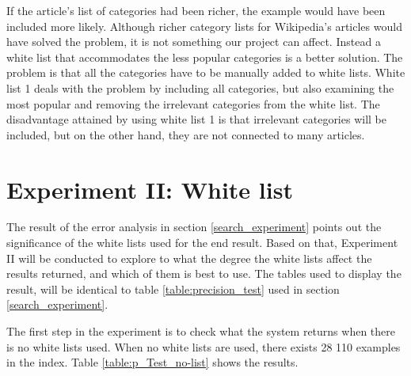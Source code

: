 If the article's list of categories had been richer, the example would have been included more likely. Although richer category lists for Wikipedia's articles would have solved the problem, it is not something our project can affect. Instead a white list that accommodates the less popular categories is a better solution. The problem is that all the categories have to be manually added to white lists. White list 1 deals with the problem by including all categories, but also examining the most popular and removing the irrelevant categories from the white list. The disadvantage attained by using white list 1 is that irrelevant categories will be included, but on the other hand, they are not connected to many articles. 

\section{Experiment II: White list}

The result of the error analysis in section \ref{search_experiment} points out the significance of the white lists used for the end result. Based on that, Experiment II will be conducted to explore to what the degree the white lists affect the results returned, and which of them is best to use. The tables used to display the result, will be identical to table \ref{table:precision_test} used in section \ref{search_experiment}. 

The first step in the experiment is to check what the system returns when there is no white lists used. When no white lists are used, there exists 28 110 examples in the index. Table \ref{table:p_Test_no-list} shows the results.

